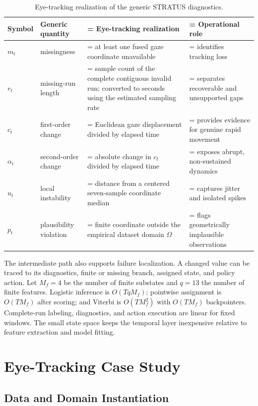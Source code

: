 \documentclass[sigconf,review]{acmart}
\begin{document}
\begin{table}[h]
\centering
\caption{Eye-tracking realization of the generic STRATUS diagnostics.}
\label{tab:et_instantiation}
\small
\begin{tabularx}{\textwidth}{@{}l p{2.45cm}
  >{\hsize=1.28\hsize\linewidth=\hsize}X
  >{\hsize=0.72\hsize\linewidth=\hsize}X@{}}
\toprule
Symbol & Generic quantity & Eye-tracking realization & Operational role \\
\midrule
$m_t$ & missingness & at least one fused gaze coordinate unavailable & identifies tracking loss \\
$r_t$ & missing-run length & sample count of the complete contiguous invalid run; converted to seconds using the estimated sampling rate & separates recoverable and unsupported gaps \\
$c_t$ & first-order change & Euclidean gaze displacement divided by elapsed time & provides evidence for genuine rapid movement \\
$\alpha_t$ & second-order change & absolute change in $c_t$ divided by elapsed time & exposes abrupt, non-sustained dynamics \\
$u_t$ & local instability & distance from a centered seven-sample coordinate median & captures jitter and isolated spikes \\
$p_t$ & plausibility violation & finite coordinate outside the empirical dataset domain $\Omega$ & flags geometrically implausible observations \\
\bottomrule
\end{tabularx}
\end{table}

The intermediate path also supports failure localization. A changed value can be traced to its diagnostics, finite or missing branch, assigned state, and policy action. Let $M_f=4$ be the number of finite substates and $q=13$ the number of finite features. Logistic inference is $O(TqM_f)$; pointwise assignment is $O(TM_f)$ after scoring; and Viterbi is $O(TM_f^2)$ with $O(TM_f)$ backpointers. Complete-run labeling, diagnostics, and action execution are linear for fixed windows. The small state space keeps the temporal layer inexpensive relative to feature extraction and model fitting.

\section{Eye-Tracking Case Study}
\label{sec:case_study}

\subsection{Data and Domain Instantiation}
\end{document}
